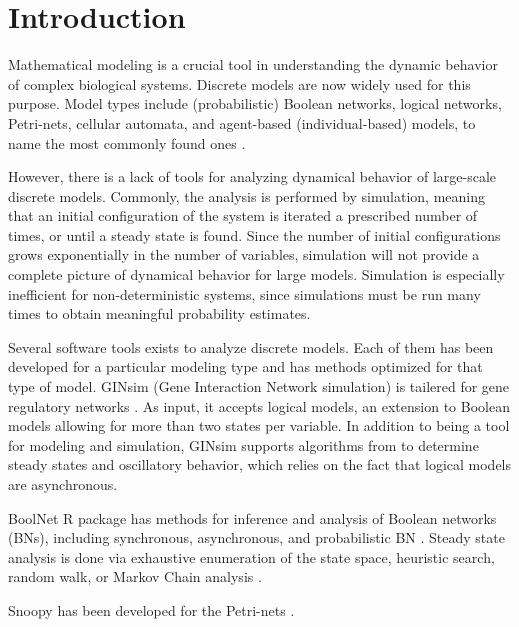 \documentclass[11pt]{amsart}
\begin{document}
\section{Introduction}
Mathematical modeling is a crucial tool in understanding the dynamic behavior of complex
biological systems. Discrete models are now widely used for this purpose.  Model types include
(probabilistic) Boolean networks, logical networks, Petri-nets, cellular
automata, and agent-based (individual-based) models, to name the most commonly found ones \cite{Steggles, heiner-petri, shmulevich, Chaouiya, cell-automata, springer_book}.
 
 
However, there is a lack of tools
for analyzing dynamical behavior of large-scale discrete models. Commonly, the analysis is performed by simulation, meaning that an
initial configuration of the system is iterated a prescribed number of times, or until a
steady state is found. Since the number of initial configurations grows exponentially in the number of variables, simulation
will not provide a complete picture of dynamical behavior for large models.
Simulation is especially inefficient for non-deterministic
systems, since simulations must be run many times to obtain meaningful
probability estimates.
 
 
Several software tools exists to analyze discrete models. Each of them has been developed for a particular modeling type and has methods optimized for that type of model. GINsim (Gene Interaction Network simulation) is tailered for gene regulatory networks \cite{GINsim}. As input, it accepts logical models, an extension to Boolean models allowing for more than two states per variable. In addition to being a tool for modeling and simulation, GINsim supports algorithms from \cite{Chaouiya} to determine steady states and oscillatory behavior, which relies on the fact that logical models are asynchronous. 
 
BoolNet R package has methods for inference and analysis of Boolean networks (BNs), including synchronous, asynchronous, and probabilistic BN \cite{boolnet}. Steady state analysis is done via exhaustive enumeration of the state space, heuristic search, random walk, or Markov Chain analysis \cite{shmulevich}. 
 
Snoopy has been developed for the Petri-nets \cite{Snoopy}. 
 
\end{document}

